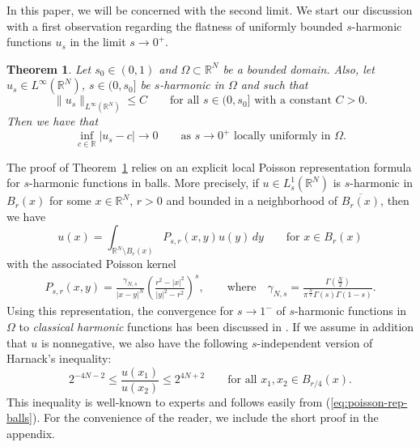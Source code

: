 \documentclass[notitlepage,11pt,reqno]{amsart}
\newtheorem{theorem}{Theorem}[section]
\theoremstyle{definition}
\numberwithin{equation}{section}
\newcommand{\RRN}{\mathds{R}^{N}}
\newcommand{\R}{\mathds{R}}
\newcommand{\RR}{\mathds{R}}
\begin{document}
In this paper, we will be concerned with the second limit. We start our discussion with a first observation regarding the flatness of uniformly bounded $s$-harmonic functions $u_s$ in the limit $s \to 0^+$. 

\begin{theorem}\label{thm1.0}
  Let $s_0 \in (0,1)$ and $\Omega \subset \RRN$ be a bounded domain. Also, let $u_s \in L^\infty(\RR^N)$, $s \in (0,s_0]$ be $s$-harmonic in $\Omega$ and such that
  \begin{equation}
    \label{eq:them1.0-assumption}
  \|u_s\|_{L^\infty(\RR^N)} \le C \qquad \text{for all $s \in (0,s_0]$ with a constant $C>0$.}
  \end{equation}
  Then we have that
  $$
  \inf_{c \in \RR}|u_s-c| \to 0 \qquad \text{as $s \to 0^+$ locally uniformly in $\Omega$.}
  $$
\end{theorem}


The proof of Theorem~\ref{thm1.0} relies on an explicit local Poisson representation formula for $s$-harmonic functions in balls. More precisely, if $u \in L^1_{s}(\RR^N)$ is $s$-harmonic in $B_r(x)$ for some $x \in \R^N$, $r>0$ and bounded in a neighborhood of $\overline{B_r(x)}$, then we have 
\begin{equation}
  \label{eq:poisson-rep-balls}
u(x) = \int_{\RR^N\setminus B_r(x)}P_{s,r}(x, y) u(y)\, dy \qquad \text{for $x \in B_r(x)$}
\end{equation}
with the associated Poisson kernel
\begin{align*}
    P_{s, r}(x, y)=\frac{\gamma_{N, s}}{|x-y|^N}\left(\frac{r^2-|x|^2}{|y|^2-r^2}\right)^s, \qquad \text{where}\quad \gamma_{N,s}=\frac{\Gamma(\frac{N}{2})}{\pi^{\frac{N}{2}}\Gamma(s)\Gamma(1-s)}.
\end{align*}
Using this representation, the convergence for $s\to 1^-$ of $s$-harmonic functions in $\Omega$ to \textit{classical harmonic} functions has been discussed in \cite[Theorem 5.80]{GH24}.
If we assume in addition that $u$ is nonnegative, we also have the following $s$-independent version of Harnack's inequality:
\begin{equation}\label{harnack s-0}
2^{-4N-2}\leq \frac{u(x_1)}{u(x_2)}\leq 2^{4N+2}\qquad\text{for all $x_1,x_2\in B_{r/4}(x)$.}
\end{equation}
This inequality is well-known to experts and follows easily from (\ref{eq:poisson-rep-balls}). For the convenience of the reader, we include the short proof in the appendix. 
\end{document}
